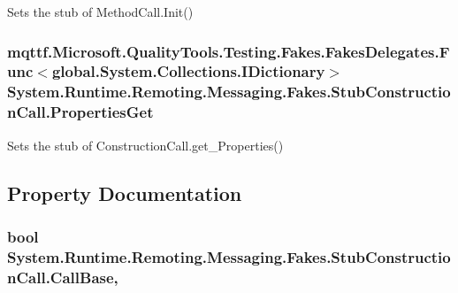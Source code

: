 Sets the stub of Method\-Call.\-Init()

\hypertarget{class_system_1_1_runtime_1_1_remoting_1_1_messaging_1_1_fakes_1_1_stub_construction_call_a749f97b913073960fcde8bdbfde45645}{
\subsubsection[{Properties\-Get}]{\setlength{\rightskip}{0pt plus 5cm}mqttf.\-Microsoft.\-Quality\-Tools.\-Testing.\-Fakes.\-Fakes\-Delegates.\-Func$<$global.\-System.\-Collections.\-I\-Dictionary$>$ System.\-Runtime.\-Remoting.\-Messaging.\-Fakes.\-Stub\-Construction\-Call.\-Properties\-Get}}\label{class_system_1_1_runtime_1_1_remoting_1_1_messaging_1_1_fakes_1_1_stub_construction_call_a749f97b913073960fcde8bdbfde45645}


Sets the stub of Construction\-Call.\-get\-\_\-\-Properties()



\subsection{Property Documentation}
\hypertarget{class_system_1_1_runtime_1_1_remoting_1_1_messaging_1_1_fakes_1_1_stub_construction_call_acc826667ba7223726b92a5963067cbe3}{
\subsubsection[{Call\-Base}]{\setlength{\rightskip}{0pt plus 5cm}bool System.\-Runtime.\-Remoting.\-Messaging.\-Fakes.\-Stub\-Construction\-Call.\-Call\-Base\hspace{0.3cm}{\ttfamily [get]}, {\ttfamily [set]}}}\label{class_system_1_1_runtime_1_1_remoting_1_1_messaging_1_1_fakes_1_1_stub_construction_call_acc826667ba7223726b92a5963067cbe3}


